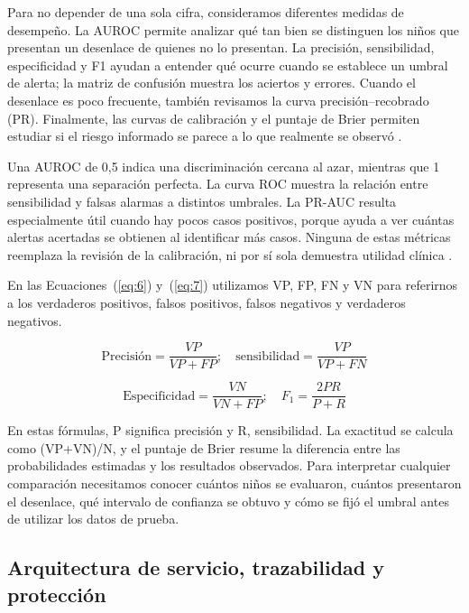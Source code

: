 Para no depender de una sola cifra, consideramos diferentes medidas de desempeño. La AUROC permite analizar qué tan bien se distinguen los niños que presentan un desenlace de quienes no lo presentan. La precisión, sensibilidad, especificidad y F1 ayudan a entender qué ocurre cuando se establece un umbral de alerta; la matriz de confusión muestra los aciertos y errores. Cuando el desenlace es poco frecuente, también revisamos la curva precisión--recobrado (PR). Finalmente, las curvas de calibración y el puntaje de Brier permiten estudiar si el riesgo informado se parece a lo que realmente se observó \cite{r18,r24}.

Una AUROC de 0,5 indica una discriminación cercana al azar, mientras que 1 representa una separación perfecta. La curva ROC muestra la relación entre sensibilidad y falsas alarmas a distintos umbrales. La PR-AUC resulta especialmente útil cuando hay pocos casos positivos, porque ayuda a ver cuántas alertas acertadas se obtienen al identificar más casos. Ninguna de estas métricas reemplaza la revisión de la calibración, ni por sí sola demuestra utilidad clínica \cite{r18,r24}.

En las Ecuaciones~(\ref{eq:6}) y~(\ref{eq:7}) utilizamos VP, FP, FN y VN para referirnos a los verdaderos positivos, falsos positivos, falsos negativos y verdaderos negativos.

\begin{equation}
\text{Precisión}=\frac{VP}{VP+FP};\quad \text{sensibilidad}=\frac{VP}{VP+FN}
\label{eq:6}
\end{equation}

\begin{equation}
\text{Especificidad}=\frac{VN}{VN+FP};\quad F_1=\frac{2PR}{P+R}
\label{eq:7}
\end{equation}

En estas fórmulas, P significa precisión y R, sensibilidad. La exactitud se calcula como (VP+VN)/N, y el puntaje de Brier resume la diferencia entre las probabilidades estimadas y los resultados observados. Para interpretar cualquier comparación necesitamos conocer cuántos niños se evaluaron, cuántos presentaron el desenlace, qué intervalo de confianza se obtuvo y cómo se fijó el umbral antes de utilizar los datos de prueba.

\subsection{Arquitectura de servicio, trazabilidad y protección}
\label{sec:3.7}

